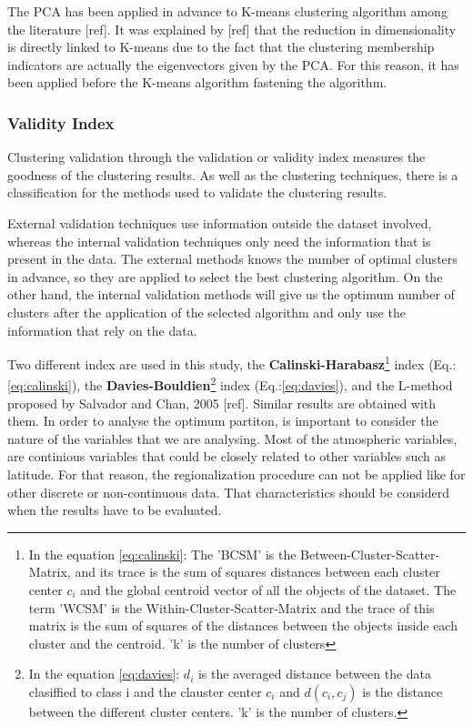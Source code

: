 The PCA has been applied in advance to K-means clustering algorithm among the literature [ref]. It was explained by [ref] that the reduction in dimensionality is directly linked to K-means due to the fact that the clustering membership indicators are actually the eigenvectors given by the PCA. For this reason, it has been applied before the K-means algorithm fastening the algorithm.

\subsubsection{Validity Index}

Clustering validation through the validation or validity index measures the goodness of the clustering results. As well as the clustering techniques, there is a classification for the methods used to validate the clustering results.

External validation techniques use information outside the dataset involved, whereas the internal validation techniques only need the information that is present in the data. The external methods knows the number of optimal clusters in advance, so they are applied to select the best clustering algorithm. On the other hand, the internal validation methods will give us the optimum number of clusters after the application of the selected algorithm and only use the information that rely on the data.

Two different index are used in this study, the \textbf{Calinski-Harabasz}\footnote{In the equation \ref{eq:calinski}: The 'BCSM' is the Between-Cluster-Scatter-Matrix, and its trace is the sum of squares distances between each cluster center $c_{i}$ and the global centroid vector of all the objects of the dataset. The term 'WCSM' is the Within-Cluster-Scatter-Matrix and the trace of this matrix is the sum of squares of the distances between the objects inside each cluster and the centroid. 'k' is the number of clusters} index (Eq.:\ref{eq:calinski}), the \textbf{Davies-Bouldien}\footnote{In the equation \ref{eq:davies}: $d_{i}$ is the averaged distance between the data clasiffied to class i and the clauster center $c_{i}$ and $d(c_i,c_j)$ is the distance between the different cluster centers. 'k' is the number of clusters.}  index (Eq.:\ref{eq:davies}), and the L-method proposed by Salvador and Chan, 2005 [ref]. Similar results are obtained with them. In order to analyse the optimum partiton, is important to consider the nature of the variables that we are analysing. Most of the atmospheric variables, are continious variables that could be closely related to other variables such as latitude. For that reason, the regionalization procedure can not be applied like for other discrete or non-continuous data. That characteristics should be considerd when the results have to be evaluated.

